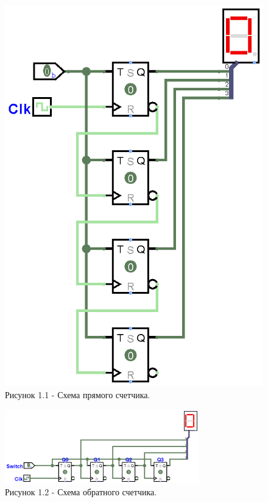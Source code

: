 \documentclass[oneside,a4paper,14pt]{extarticle}
\begin{document}
\begin{figure}[h!]
	\centering
	\includegraphics[height=0.7\textheight]{pics/1_1.png}
	\caption*{Рисунок 1.1 - Схема прямого счетчика.}
\end{figure}

\begin{figure}[h!]
	\centering
	\includegraphics[width=0.75\textwidth]{pics/1_2.png}
	\caption*{Рисунок 1.2 - Схема обратного счетчика.}
\end{figure}
\end{document}
